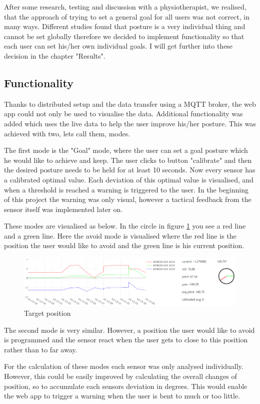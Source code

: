 After some research, testing and discussion with a physiotherapist, we realised, that the approach of trying to set a general goal for all users was not correct, in many ways. Different studies found that posture is a very individual thing and cannot be set globally \cite{SitUpSt77:online} therefore we decided to implement functionality so that each user can set his/her own individual goals. I will get further into these decision in the chapter "Results".

\subsection{Functionality}

Thanks to distributed setup and the data transfer using a MQTT broker, the web app could not only be used to visualise the data. Additional functionality was added which uses the live data to help the user improve his/her posture. This was achieved with two, lets call them, modes. 

The first mode is the "Goal" mode, where the user can set a goal posture which he would like to achieve and keep. The user clicks to button "calibrate" and then the desired posture needs to be held for at least 10 seconds. 
Now every sensor has a calibrated optimal value. Each deviation of this optimal value is visualised, and when a threshold is reached a warning is triggered to the user. In the beginning of this project the warning was only visual, however a tactical feedback from the sensor itself was implemented later on.

These modes are visualised as below. In the circle in figure \ref{fig:TargetPosition} you see a red line and a green line. Here the avoid mode is visualised where the red line is the position the user would like to avoid and the green line is his current position.

\begin{figure}[ht]
  \begin{center}
\includegraphics[width=\textwidth]{images/WebAppCircle.png}
  \end{center}
  \caption{Target position}
  \label{fig:TargetPosition}
\end{figure}

The second mode is very similar. However, a position the user would like to avoid is programmed and the sensor react when the user gets to close to this position rather than to far away. 

For the calculation of these modes each sensor was only analysed individually. However, this could be easily improved by calculating the overall changes of position, so to accumulate each sensors deviation in degrees. This would enable the web app to trigger a warning when the user is bent to much or too little.